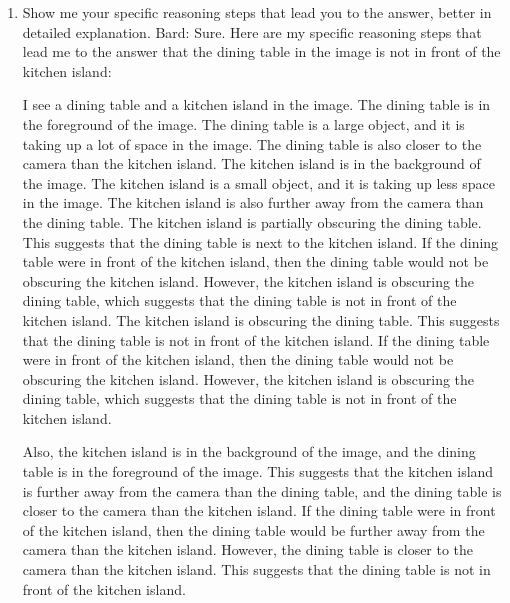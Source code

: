 \begin{enumerate}
    Therefore, the dining table in the image is not in front of the kitchen island. The dining table is next to the kitchen island.
    \subitem Visual ChatGPT: The dinning table is located near the kitchen island, and the two are separated by a few feet. From the observation of the image, it appears that the dinning table is not in front of the kitchen island.
    \subitem MiniGPT-4: No, the dinning table is in the same room as the kitchen island but it is not in front of it.
    \item Show me your specific reasoning steps that lead you to the answer, better in detailed explanation.
    \subitem Bard: 
    Sure. Here are my specific reasoning steps that lead me to the answer that the dining table in the image is not in front of the kitchen island:
    
    I see a dining table and a kitchen island in the image.
    The dining table is in the foreground of the image. The dining table is a large object, and it is taking up a lot of space in the image. The dining table is also closer to the camera than the kitchen island.
    The kitchen island is in the background of the image. The kitchen island is a small object, and it is taking up less space in the image. The kitchen island is also further away from the camera than the dining table.
    The kitchen island is partially obscuring the dining table. This suggests that the dining table is next to the kitchen island.
    If the dining table were in front of the kitchen island, then the dining table would not be obscuring the kitchen island. However, the kitchen island is obscuring the dining table, which suggests that the dining table is not in front of the kitchen island.
    The kitchen island is obscuring the dining table. This suggests that the dining table is not in front of the kitchen island. If the dining table were in front of the kitchen island, then the dining table would not be obscuring the kitchen island. However, the kitchen island is obscuring the dining table, which suggests that the dining table is not in front of the kitchen island.
    
    Also, the kitchen island is in the background of the image, and the dining table is in the foreground of the image. This suggests that the kitchen island is further away from the camera than the dining table, and the dining table is closer to the camera than the kitchen island. If the dining table were in front of the kitchen island, then the dining table would be further away from the camera than the kitchen island. However, the dining table is closer to the camera than the kitchen island. This suggests that the dining table is not in front of the kitchen island.
    

\end{enumerate}
